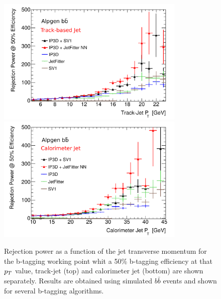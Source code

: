 \begin{figure}[!tp]
\centering
\includegraphics[width=0.8\textwidth]{figure/trackjet/std_rej_pt2.pdf}
\includegraphics[width=0.8\textwidth]{figure/trackjet/std_cal_rej_pt2.pdf}
\caption{Rejection power as a function of the jet transverse momentum for the b-tagging 
	working point whit a  50\% b-tagging efficiency at that $p_{T}$ value, track-jet (top) and calorimeter jet (bottom) are
	shown separately. Results are obtained using simulated $b\bar{b}$ events
	and shown for several b-tagging algorithms.}
\label{fig:rej_pt}
\end{figure}    


